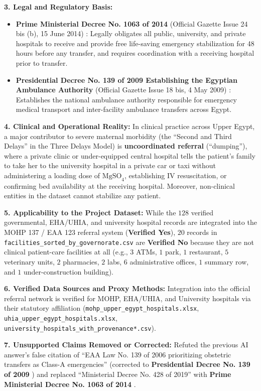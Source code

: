 \documentclass[10pt,a4paper]{article}
\begin{document}
\textbf{3. Legal and Regulatory Basis:}
\begin{itemize}
    \item \textbf{Prime Ministerial Decree No. 1063 of 2014} (Official Gazette Issue 24 bis (b), 15 June 2014) \cite{egypt_pm_decree_1063_2014}: Legally obligates all public, university, and private hospitals to receive and provide free life-saving emergency stabilization for 48 hours before any transfer, and requires coordination with a receiving hospital prior to transfer.
    \item \textbf{Presidential Decree No. 139 of 2009 Establishing the Egyptian Ambulance Authority} (Official Gazette Issue 18 bis, 4 May 2009) \cite{egypt_pres_decree_139_2009_eaa}: Establishes the national ambulance authority responsible for emergency medical transport and inter-facility ambulance transfers across Egypt.
\end{itemize}

\textbf{4. Clinical and Operational Reality:}
In clinical practice across Upper Egypt, a major contributor to severe maternal morbidity (the ``Second and Third Delays'' in the Three Delays Model) is \textbf{uncoordinated referral} (``dumping''), where a private clinic or under-equipped central hospital tells the patient's family to take her to the university hospital in a private car or taxi without administering a loading dose of $\text{MgSO}_4$, establishing IV resuscitation, or confirming bed availability at the receiving hospital. Moreover, non-clinical entities in the dataset cannot stabilize any patient.

\textbf{5. Applicability to the Project Dataset:}
While the $128$ verified governmental, EHA/UHIA, and university hospital records are integrated into the MOHP 137 / EAA 123 referral system (\textbf{Verified Yes}), $20$ records in \texttt{facilities\_sorted\_by\_governorate.csv} are \textbf{Verified No} because they are not clinical patient-care facilities at all (e.g., $3$ ATMs, $1$ park, $1$ restaurant, $5$ veterinary units, $2$ pharmacies, $2$ labs, $6$ administrative offices, $1$ summary row, and $1$ under-construction building).

\textbf{6. Verified Data Sources and Proxy Methods:}
Integration into the official referral network is verified for MOHP, EHA/UHIA, and University hospitals via their statutory affiliation (\texttt{mohp\_upper\_egypt\_hospitals.xlsx}, \texttt{uhia\_upper\_egypt\_hospitals.xlsx}, \texttt{university\_hospitals\_with\_provenance*.csv}).

\textbf{7. Unsupported Claims Removed or Corrected:}
Refuted the previous AI answer's false citation of ``EAA Law No. 139 of 2006 prioritizing obstetric transfers as Class-A emergencies'' (corrected to \textbf{Presidential Decree No. 139 of 2009} \cite{egypt_pres_decree_139_2009_eaa}) and replaced ``Ministerial Decree No. 428 of 2019'' with \textbf{Prime Ministerial Decree No. 1063 of 2014} \cite{egypt_pm_decree_1063_2014}.
\end{document}

